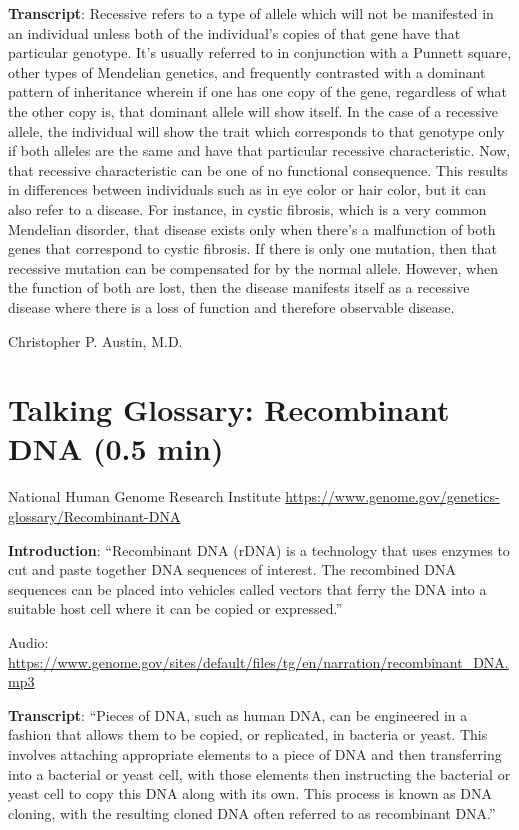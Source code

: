 \documentclass[
]{book}
\begin{document}
\textbf{Transcript}: Recessive refers to a type of allele which will not be manifested in an individual unless both of the individual's copies of that gene have that particular genotype. It's usually referred to in conjunction with a Punnett square, other types of Mendelian genetics, and frequently contrasted with a dominant pattern of inheritance wherein if one has one copy of the gene, regardless of what the other copy is, that dominant allele will show itself. In the case of a recessive allele, the individual will show the trait which corresponds to that genotype only if both alleles are the same and have that particular recessive characteristic. Now, that recessive characteristic can be one of no functional consequence. This results in differences between individuals such as in eye color or hair color, but it can also refer to a disease. For instance, in cystic fibrosis, which is a very common Mendelian disorder, that disease exists only when there's a malfunction of both genes that correspond to cystic fibrosis. If there is only one mutation, then that recessive mutation can be compensated for by the normal allele. However, when the function of both are lost, then the disease manifests itself as a recessive disease where there is a loss of function and therefore observable disease.

Christopher P. Austin, M.D.

\hypertarget{talking-glossary-recombinant-dna-0.5-min}{%
\section{Talking Glossary: Recombinant DNA (0.5 min)}\label{talking-glossary-recombinant-dna-0.5-min}}

National Human Genome Research Institute
\url{https://www.genome.gov/genetics-glossary/Recombinant-DNA}

\textbf{Introduction}: ``Recombinant DNA (rDNA) is a technology that uses enzymes to cut and paste together DNA sequences of interest. The recombined DNA sequences can be placed into vehicles called vectors that ferry the DNA into a suitable host cell where it can be copied or expressed.''

Audio: \url{https://www.genome.gov/sites/default/files/tg/en/narration/recombinant_DNA.mp3}

\textbf{Transcript}: ``Pieces of DNA, such as human DNA, can be engineered in a fashion that allows them to be copied, or replicated, in bacteria or yeast. This involves attaching appropriate elements to a piece of DNA and then transferring into a bacterial or yeast cell, with those elements then instructing the bacterial or yeast cell to copy this DNA along with its own. This process is known as DNA cloning, with the resulting cloned DNA often referred to as recombinant DNA.''
\end{document}
